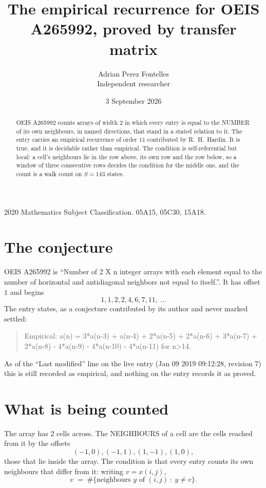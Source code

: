 \documentclass[11pt,a4paper]{article}
\title{The empirical recurrence for OEIS A265992, proved by transfer matrix}
\author{Adrian Perez Fontelles\\ \small Independent researcher}
\date{3 September 2026}
\theoremstyle{plain}
\theoremstyle{definition}
\begin{document}
\maketitle

\begin{abstract}
OEIS A265992 counts arrays of width $2$ in which every entry is equal to the NUMBER of its own
neighbours, in named directions, that stand in a stated relation to it. The entry carries an
empirical recurrence of order $11$ contributed by R.~H.~Hardin. It is true, and it is
decidable rather than empirical. The condition is self-referential but local: a cell's
neighbours lie in the row above, its own row and the row below, so a window of three
consecutive rows decides the condition for the middle one, and the count is a walk count on
$S=143$ states.
\end{abstract}

\noindent\small 2020 Mathematics Subject Classification. 05A15, 05C30, 15A18.\normalsize

\section{The conjecture}

OEIS A265992 is ``Number of 2 X n integer arrays with each element equal to the number of horizontal and antidiagonal neighbors not equal to itself.''. It has offset $1$ and begins
\[
1, 1, 2, 2, 4, 6, 7, 11,\ \dots
\]
The entry states, as a conjecture contributed by its author and never marked settled:
\begin{quote}
Empirical: a(n) = 3*a(n-3) + a(n-4) + 2*a(n-5) + 2*a(n-6) + 3*a(n-7) + 2*a(n-8) - 4*a(n-9) - 4*a(n-10) - 4*a(n-11) for n>14.
\end{quote}
As of the ``Last modified'' line on the live entry (Jan 09 2019 09:12:28, revision 7) this is still
recorded as empirical, and nothing on the entry records it as proved.

\section{What is being counted}

The array has $2$ cells across. The NEIGHBOURS of a cell are the cells reached from it by the
offsets
\[
(-1,0), (-1,1), (1,-1), (1,0),
\]
those that lie inside the array. The condition is that every entry counts its own neighbours
that differ from it: writing $v=x(i,j)$,
\[
v\;=\;\#\{\text{neighbours } y \text{ of } (i,j)\ :\ y\ne v\} .
\]
\end{document}
